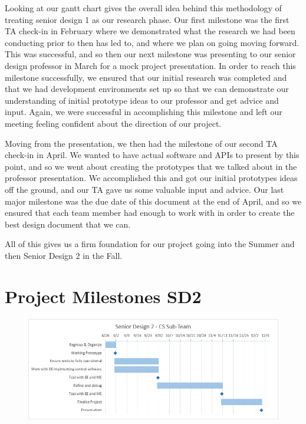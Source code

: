 \documentclass[12pt]{report}
\begin{document}
Looking at our gantt chart gives the overall idea behind this methodology of treating senior design 1 as our research phase. Our first milestone was the first TA check-in in February where we demonstrated what the research we had been conducting prior to then has led to, and where we plan on going moving forward. This was successful, and so then our next milestone was presenting to our senior design professor in March for a mock project presentation. In order to reach this milestone successfully, we ensured that our initial research was completed and that we had development environments set up so that we can demonstrate our understanding of initial prototype ideas to our professor and get advice and input. Again, we were successful in accomplishing this milestone and left our meeting feeling confident about the direction of our project.

Moving from the presentation, we then had the milestone of our second TA check-in in April. We wanted to have actual software and APIs to present by this point, and so we went about creating the prototypes that we talked about in the professor presentation. We accomplished this and got our initial prototypes ideas off the ground, and our TA gave us some valuable input and advice. Our last major milestone was the due date of this document at the end of April, and so we ensured that each team member had enough to work with in order to create the best design document that we can.

All of this gives us a firm foundation for our project going into the Summer and then Senior Design 2 in the Fall.

\section*{Project Milestones SD2}

\begin{figure}[h]
	\centering
	\includegraphics[width=\linewidth]{SD2Gantt}
\end{figure}
\end{document}

